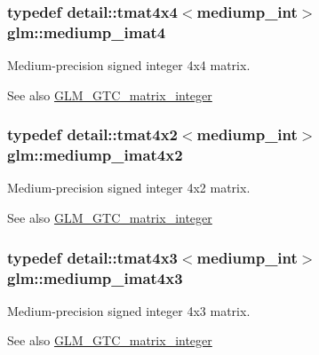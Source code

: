 \subsubsection[{mediump\+\_\+imat4}]{\setlength{\rightskip}{0pt plus 5cm}typedef detail\+::tmat4x4$<$mediump\+\_\+int$>$ {\bf glm\+::mediump\+\_\+imat4}}\label{group__gtc__matrix__integer_ga49908c8634fad44d78f09c3876c944db}
Medium-\/precision signed integer 4x4 matrix. \begin{DoxySeeAlso}{See also}
\hyperlink{group__gtc__matrix__integer}{G\+L\+M\+\_\+\+G\+T\+C\+\_\+matrix\+\_\+integer} 
\end{DoxySeeAlso}
\hypertarget{group__gtc__matrix__integer_ga258c149bc7dc443db025b6a7c8a8492b}{}
\subsubsection[{mediump\+\_\+imat4x2}]{\setlength{\rightskip}{0pt plus 5cm}typedef detail\+::tmat4x2$<$mediump\+\_\+int$>$ {\bf glm\+::mediump\+\_\+imat4x2}}\label{group__gtc__matrix__integer_ga258c149bc7dc443db025b6a7c8a8492b}
Medium-\/precision signed integer 4x2 matrix. \begin{DoxySeeAlso}{See also}
\hyperlink{group__gtc__matrix__integer}{G\+L\+M\+\_\+\+G\+T\+C\+\_\+matrix\+\_\+integer} 
\end{DoxySeeAlso}
\hypertarget{group__gtc__matrix__integer_ga689c74a65fc4118f1fe57b6cf953748b}{}
\subsubsection[{mediump\+\_\+imat4x3}]{\setlength{\rightskip}{0pt plus 5cm}typedef detail\+::tmat4x3$<$mediump\+\_\+int$>$ {\bf glm\+::mediump\+\_\+imat4x3}}\label{group__gtc__matrix__integer_ga689c74a65fc4118f1fe57b6cf953748b}
Medium-\/precision signed integer 4x3 matrix. \begin{DoxySeeAlso}{See also}
\hyperlink{group__gtc__matrix__integer}{G\+L\+M\+\_\+\+G\+T\+C\+\_\+matrix\+\_\+integer} 
\end{DoxySeeAlso}
\hypertarget{group__gtc__matrix__integer_gaced73f9aecd6626cdfef5bfb3648b750}{}
